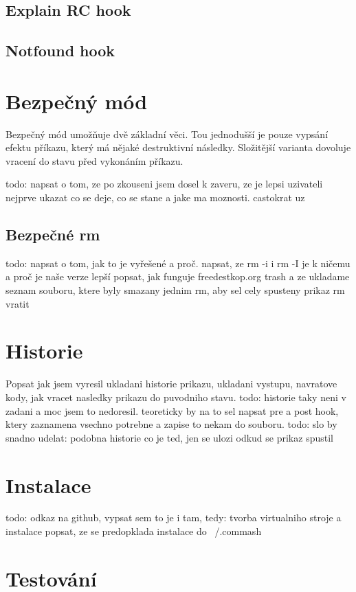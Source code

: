\documentclass[thesis=M,czech]{FITthesis}[2012/06/26]
\begin{document}
\subsection{Explain RC hook}

\subsection{Notfound hook}

%
%
%
%
%
\section{Bezpečný mód}
Bezpečný mód umožňuje dvě základní věci. Tou jednodušší je pouze vypsání efektu příkazu, který má nějaké destruktivní následky. Složitější varianta dovoluje vracení do stavu před vykonáním příkazu.

todo: napsat o tom, ze po zkouseni jsem dosel k zaveru, ze je lepsi uzivateli nejprve ukazat co se deje, co se stane a jake ma moznosti. castokrat uz 


\subsection{Bezpečné rm}
todo: napsat o tom, jak to je vyřešené a proč. napsat, ze rm -i i rm -I je k ničemu a proč je naše verze lepší
popsat, jak funguje freedestkop.org trash a ze ukladame seznam souboru, ktere byly smazany jednim rm, aby sel cely spusteny prikaz rm vratit 


\section{Historie}
Popsat jak jsem vyresil ukladani historie prikazu, ukladani vystupu, navratove kody, jak vracet nasledky prikazu do puvodniho stavu.
todo: historie taky neni v zadani a moc jsem to nedoresil. teoreticky by na to sel napsat pre a post hook, ktery zaznamena vsechno potrebne a zapise to nekam do souboru.
todo: slo by snadno udelat: podobna historie co je ted, jen se ulozi odkud se prikaz spustil


\section{Instalace}
todo: odkaz na github, vypsat sem to je i tam, tedy: tvorba virtualniho stroje a instalace
popsat, ze se predopklada instalace do ~/.commash

\section{Testování}
\end{document}
